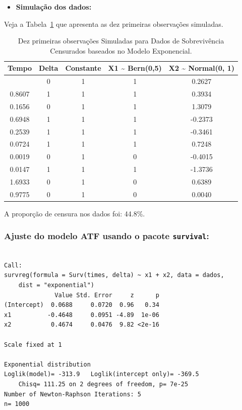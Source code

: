 \documentclass[
  12pt,
  letterpaper,
  DIV=11,
  numbers=noendperiod]{scrreprt}
\providecommand{\tightlist}{%
  \setlength{\itemsep}{0pt}\setlength{\parskip}{0pt}}\usepackage{longtable,booktabs,array}
\begin{document}
\begin{itemize}
\tightlist
\item
  \textbf{Simulação dos dados:}
\end{itemize}

Veja a Tabela~\ref{tbl-SIMULexpAFT} que apresenta as dez primeiras
observações simuladas.

\begin{longtable}[]{@{}ccccc@{}}

\caption{\label{tbl-SIMULexpAFT}Dez primeiras observações Simuladas para
Dados de Sobrevivência Censurados baseados no Modelo Exponencial.}

\tabularnewline

\toprule\noalign{}
Tempo & Delta & Constante & X1 \textasciitilde{} Bern(0,5) & X2
\textasciitilde{} Normal(0, 1) \\
\midrule\noalign{}
\endhead
\bottomrule\noalign{}
\endlastfoot
0.5804 & 0 & 1 & 1 & 0.2627 \\
0.8607 & 1 & 1 & 1 & 0.3934 \\
0.1656 & 0 & 1 & 1 & 1.3079 \\
0.6948 & 1 & 1 & 1 & -0.2373 \\
0.2539 & 1 & 1 & 1 & -0.3461 \\
0.0724 & 1 & 1 & 1 & 0.7248 \\
0.0019 & 0 & 1 & 0 & -0.4015 \\
0.0147 & 1 & 1 & 1 & -1.3736 \\
1.6933 & 0 & 1 & 0 & 0.6389 \\
0.9775 & 0 & 1 & 0 & 0.0040 \\

\end{longtable}

A proporção de censura nos dados foi: 44.8\%.

\subsubsection{\texorpdfstring{Ajuste do modelo ATF usando o pacote
\texttt{survival}:}{Ajuste do modelo ATF usando o pacote survival:}}\label{ajuste-do-modelo-atf-usando-o-pacote-survival}

\begin{verbatim}

Call:
survreg(formula = Surv(times, delta) ~ x1 + x2, data = dados, 
    dist = "exponential")
              Value Std. Error     z      p
(Intercept)  0.0688     0.0720  0.96   0.34
x1          -0.4648     0.0951 -4.89  1e-06
x2           0.4674     0.0476  9.82 <2e-16

Scale fixed at 1 

Exponential distribution
Loglik(model)= -313.9   Loglik(intercept only)= -369.5
    Chisq= 111.25 on 2 degrees of freedom, p= 7e-25 
Number of Newton-Raphson Iterations: 5 
n= 1000 
\end{verbatim}
\end{document}
